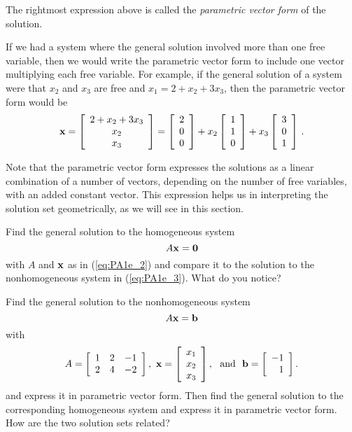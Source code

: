 \begin{pa}
\begin{equation}
\end{equation}
The rightmost expression above is called the \emph{parametric vector form} of the solution. 

If we had a system where the general solution involved more than one free variable, then we would write the parametric vector form to include one vector multiplying each free variable. For example, if the general solution of a system were that $x_2$ and $x_3$ are free and $x_1=2+x_2+3x_3$, then the parametric vector form would be 
\[ \mathbf{x} = \left[ \begin{array}{c} 2+ x_2+3x_3 \\ x_2 \\ x_3 \end{array} \right] = \left[ \begin{array}{c} 2 \\ 0 \\ 0 \end{array} \right] + x_2 \left[ \begin{array}{c} 1 \\ 1 \\ 0 \end{array} \right] + x_3 \left[ \begin{array}{c} 3 \\ 0 \\ 1\end{array} \right] \, . \]

Note that the parametric vector form expresses the solutions as a linear combination of a number of vectors, depending on the number of free variables, with an added constant vector. This expression helps us in interpreting the solution set geometrically, as we will see in this section.


	
	\ba
	\item Find the general solution to the homogeneous system 
	\[A \mathbf{x} = \mathbf{0}\]
	with $A$ and $\mathbf{x}$ as in (\ref{eq:PA1e_2}) and compare it to the solution to the nonhomogeneous system in (\ref{eq:PA1e_3}). What do you notice? 


	\item Find the general solution to the nonhomogeneous system 
	\[A \mathbf{x} = \mathbf{b}\]
	with 
\[A = \left[ \begin{array}{ccr} 1&2&-1 \\ 2&4&-2 \end{array} \right], \ \mathbf{x} =  \left[ \begin{array}{c} x_1 \\ x_2 \\ x_3 \end{array} \right], \ \text{ and } \ \mathbf{b} =  \left[ \begin{array}{r} -1 \\ 1 \end{array} \right].\]
and express it in parametric vector form. Then find the general solution to the corresponding homogeneous system and express it in parametric vector form. How are the two solution sets related? 



\end{pa}
